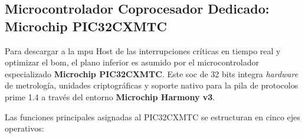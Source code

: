 \subsection{Microcontrolador Coprocesador Dedicado: Microchip PIC32CXMTC}
\label{subsec:coprocesador_pic32}

Para descargar a la \gls{mpu} Host de las interrupciones críticas en tiempo real y optimizar el \gls{bom}, el plano inferior es asumido por el microcontrolador especializado \textbf{Microchip PIC32CXMTC}. Este \gls{soc} de 32 bits integra \textit{hardware} de metrología, unidades criptográficas y soporte nativo para la pila de protocolos \gls{prime} 1.4 a través del entorno \textbf{Microchip Harmony v3}.

Las funciones principales asignadas al PIC32CXMTC se estructuran en cinco ejes operativos:

